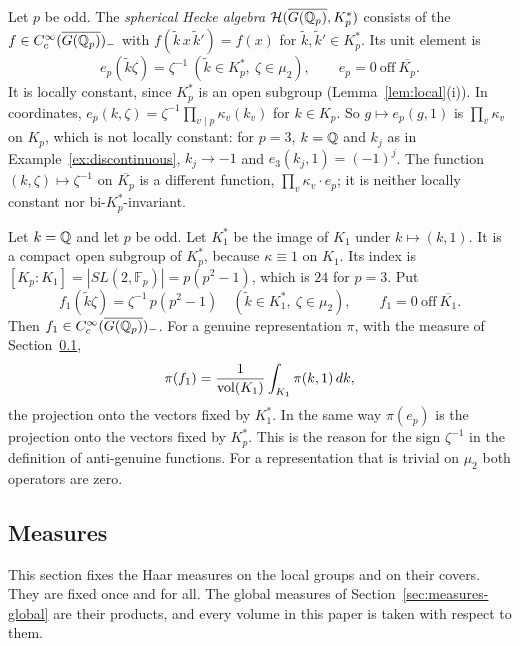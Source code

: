 Let $p$ be odd. The \emph{spherical Hecke algebra}
$\mathcal H(\overline{G(\mathbb{Q}_p)},K_p^*)$ consists of the
$f\in C_c^\infty(\overline{G(\mathbb{Q}_p)})_-$ with
$f(\tilde k\,x\,\tilde k')=f(x)$ for $\tilde k,\tilde k'\in K_p^*$. Its
unit element is
\begin{equation}\label{eq:unit}
e_p(\tilde k\zeta)=\zeta^{-1}\ (\tilde k\in K_p^*,\ \zeta\in\mu_2),\qquad
e_p=0\ \text{off}\ \overline{K_p}.
\end{equation}
It is locally constant, since $K_p^*$ is an open subgroup
(Lemma~\ref{lem:local}(i)). In coordinates,
$e_p(k,\zeta)=\zeta^{-1}\prod_{v\mid p}\kappa_v(k_v)$ for $k\in K_p$. So
$g\mapsto e_p(g,1)$ is $\prod_v\kappa_v$ on $K_p$, which is not locally
constant: for $p=3$, $k=\mathbb{Q}$ and $k_j$ as in
Example~\ref{ex:discontinuous}, $k_j\to-1$ and $e_3(k_j,1)=(-1)^j$. The
function $(k,\zeta)\mapsto\zeta^{-1}$ on $\overline{K_p}$ is a different
function, $\prod_v\kappa_v\cdot e_p$; it is neither locally constant nor
bi-$K_p^*$-invariant.

\begin{example}\label{ex:hecke-local}
Let $k=\mathbb{Q}$ and let $p$ be odd. Let $K_1^*$ be the image of $K_1$ under
$k\mapsto(k,1)$. It is a compact open subgroup of $K_p^*$, because
$\kappa\equiv1$ on $K_1$. Its index is $[K_p:K_1]=|SL(2,\mathbb F_p)|=
p(p^2-1)$, which is $24$ for $p=3$. Put
\[
f_1(\tilde k\zeta)=\zeta^{-1}\,p(p^2-1)\quad(\tilde k\in K_1^*,\
\zeta\in\mu_2),\qquad f_1=0\ \text{off}\ \overline{K_1}.
\]
Then $f_1\in C_c^\infty(\overline{G(\mathbb{Q}_p)})_-$. For a genuine
representation $\pi$, with the measure of Section~\ref{sec:measures-local},
\[
\pi(f_1)=\frac1{\operatorname{vol}(K_1)}\int_{K_1}\pi(k,1)\,dk,
\]
the projection onto the vectors fixed by $K_1^*$. In the same way
$\pi(e_p)$ is the projection onto the vectors fixed by $K_p^*$. This is
the reason for the sign $\zeta^{-1}$ in the definition of anti-genuine
functions. For a representation that is trivial on $\mu_2$ both operators
are zero.
\end{example}

\subsection{Measures}\label{sec:measures-local}

This section fixes the Haar measures on the local groups and on their
covers. They are fixed once and for all. The global measures of
Section~\ref{sec:measures-global} are their products, and every volume in
this paper is taken with respect to them.


